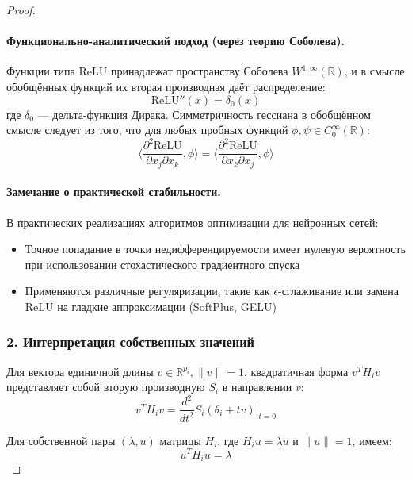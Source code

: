 \documentclass[a4paper,12pt]{article}
\begin{document}
\begin{proof}
    \paragraph{Функционально-аналитический подход (через теорию Соболева).}
    Функции типа ReLU принадлежат пространству Соболева $W^{1,\infty}(\mathbb{R})$, и в смысле обобщённых функций их вторая производная даёт распределение:
    \begin{equation}
    \text{ReLU}''(x) = \delta_0(x)
    \end{equation}
    где $\delta_0$ — дельта-функция Дирака. Симметричность гессиана в обобщённом смысле следует из того, что для любых пробных функций $\phi, \psi \in C_0^\infty(\mathbb{R})$:
    \begin{equation}
    \langle \frac{\partial^2 \text{ReLU}}{\partial x_j \partial x_k}, \phi \rangle = 
    \langle \frac{\partial^2 \text{ReLU}}{\partial x_k \partial x_j}, \phi \rangle
    \end{equation}
    
    \paragraph{Замечание о практической стабильности.}
    В практических реализациях алгоритмов оптимизации для нейронных сетей:
    \begin{itemize}
    \item Точное попадание в точки недифференцируемости имеет нулевую вероятность при использовании стохастического градиентного спуска
    \item Применяются различные регуляризации, такие как $\epsilon$-сглаживание или замена ReLU на гладкие аппроксимации (SoftPlus, GELU)
    \end{itemize}
    
    \subsubsection*{2. Интерпретация собственных значений}
    
    Для вектора единичной длины $v \in \mathbb{R}^{p_i}, \|v\|=1$, квадратичная форма $v^T H_i v$ представляет собой вторую производную $S_i$ в направлении $v$:
    \begin{equation}
    v^T H_i v = \frac{d^2}{dt^2}S_i(\theta_i + tv)\bigg|_{t=0}
    \end{equation}
    
    Для собственной пары $(λ,u)$ матрицы $H_i$, где $H_i u = λu$ и $\|u\|=1$, имеем:
    \begin{equation}
    u^T H_i u = λ
    \end{equation}
    

\end{proof}
\end{document}
